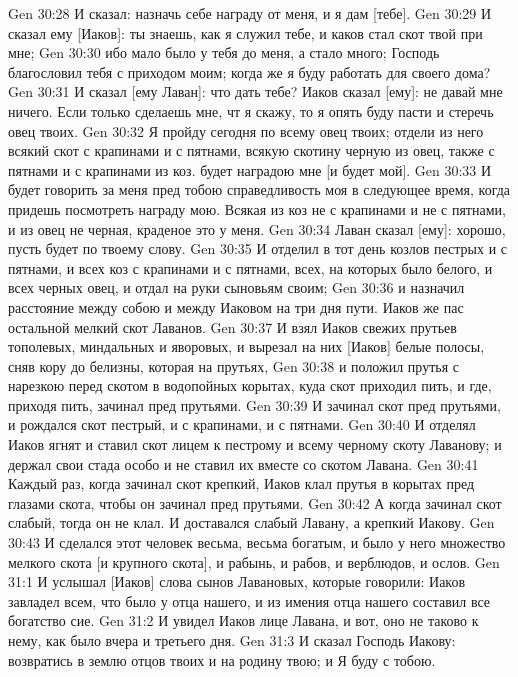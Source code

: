 \vs Gen 30:28 И сказал: назначь себе награду от меня, и я дам [тебе].
\vs Gen 30:29 И сказал ему [Иаков]: ты знаешь, как я служил тебе, и каков стал скот твой при мне;
\vs Gen 30:30 ибо мало было у тебя до меня, а стало много; Господь благословил тебя с приходом моим; когда же я буду работать для своего дома?
\vs Gen 30:31 И сказал [ему Лаван]: что дать тебе? Иаков сказал [ему]: не давай мне ничего. Если только сделаешь мне, чт я скажу, то я опять буду пасти и стеречь овец твоих.
\vs Gen 30:32 Я пройду сегодня по всему  овец твоих; отдели из него всякий скот с крапинами и с пятнами, всякую скотину черную из овец, также с пятнами и с крапинами из коз.  будет наградою мне [и будет мой].
\vs Gen 30:33 И будет говорить за меня пред тобою справедливость моя в следующее время, когда придешь посмотреть награду мою. Всякая из коз не с крапинами и не с пятнами, и из овец не черная, краденое это у меня.
\vs Gen 30:34 Лаван сказал [ему]: хорошо, пусть будет по твоему слову.
\vs Gen 30:35 И отделил в тот день козлов пестрых и с пятнами, и всех коз с крапинами и с пятнами, всех, на которых было  белого, и всех черных овец, и отдал на руки сыновьям своим;
\vs Gen 30:36 и назначил расстояние между собою и между Иаковом на три дня пути. Иаков же пас остальной мелкий скот Лаванов.
\vs Gen 30:37 И взял Иаков свежих прутьев тополевых, миндальных и яворовых, и вырезал на них [Иаков] белые полосы, сняв кору до белизны, которая на прутьях,
\vs Gen 30:38 и положил прутья с нарезкою перед скотом в водопойных корытах, куда скот приходил пить, и где, приходя пить, зачинал пред прутьями.
\vs Gen 30:39 И зачинал скот пред прутьями, и рождался скот пестрый, и с крапинами, и с пятнами.
\vs Gen 30:40 И отделял Иаков ягнят и ставил скот лицем к пестрому и всему черному скоту Лаванову; и держал свои стада особо и не ставил их вместе со скотом Лавана.
\vs Gen 30:41 Каждый раз, когда зачинал скот крепкий, Иаков клал прутья в корытах пред глазами скота, чтобы он зачинал пред прутьями.
\vs Gen 30:42 А когда зачинал скот слабый, тогда он не клал. И доставался слабый  Лавану, а крепкий Иакову.
\vs Gen 30:43 И сделался этот человек весьма, весьма богатым, и было у него множество мелкого скота [и крупного скота], и рабынь, и рабов, и верблюдов, и ослов.
\vs Gen 31:1 И услышал [Иаков] слова сынов Лавановых, которые говорили: Иаков завладел всем, что было у отца нашего, и из имения отца нашего составил все богатство сие.
\vs Gen 31:2 И увидел Иаков лице Лавана, и вот, оно не таково к нему, как было вчера и третьего дня.
\vs Gen 31:3 И сказал Господь Иакову: возвратись в землю отцов твоих и на родину твою; и Я буду с тобою.

